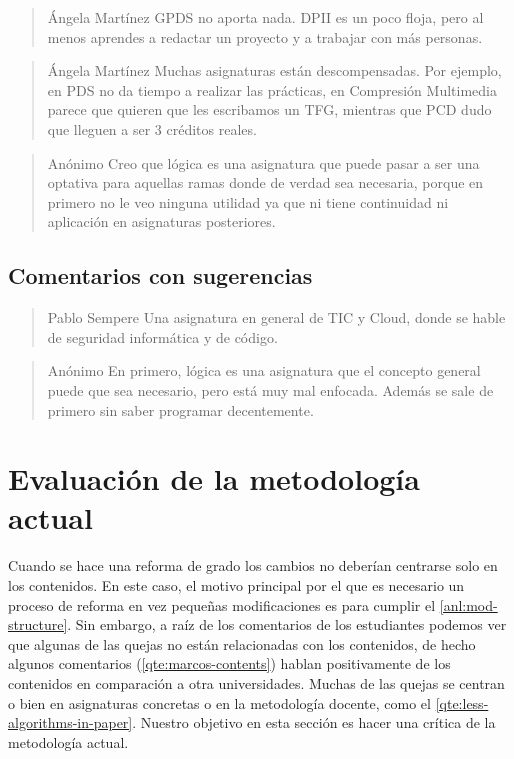 \begin{quote}{Ángela Martínez}
    GPDS no aporta nada. DPII es un poco floja, pero al menos
    aprendes a redactar un proyecto y a trabajar con más personas.
\end{quote}

\begin{quote}{Ángela Martínez}
    Muchas asignaturas están descompensadas.
    Por ejemplo, en PDS no da tiempo a realizar las prácticas,
    en Compresión Multimedia parece que quieren que les escribamos un TFG,
    mientras que PCD dudo que lleguen a ser 3 créditos reales.
\end{quote}

\begin{quote}{Anónimo}
    Creo que lógica es una asignatura que puede pasar a ser una optativa
    para aquellas ramas donde de verdad sea necesaria,
    porque en primero no le veo ninguna utilidad ya que
    ni tiene continuidad ni aplicación en asignaturas posteriores.
\end{quote}

\subsection{Comentarios con sugerencias}

\begin{quote}{Pablo Sempere}
    Una asignatura en general de TIC y Cloud,
    donde se hable de seguridad informática y de código.
\end{quote}

\begin{quote}{Anónimo}
    En primero, lógica es una asignatura que el concepto general puede que
    sea necesario, pero está muy mal enfocada. Además se sale de primero
    sin saber programar decentemente.
\end{quote}

\section{Evaluación de la metodología actual}


Cuando se hace una reforma de grado
los cambios no deberían centrarse solo en los contenidos.
En este caso, el motivo principal por el que es necesario un proceso de reforma
en vez pequeñas modificaciones es para cumplir el \cref{anl:mod-structure}.
Sin embargo, a raíz de los comentarios de los estudiantes podemos ver
que algunas de las quejas no están relacionadas con los contenidos,
de hecho algunos comentarios (\cref{qte:marcos-contents})
hablan positivamente de los contenidos en comparación a otra universidades.
Muchas de las quejas se centran o bien en asignaturas concretas
o en la metodología docente, como el \cref{qte:less-algorithms-in-paper}.
Nuestro objetivo en esta sección es hacer una crítica de la metodología actual.

